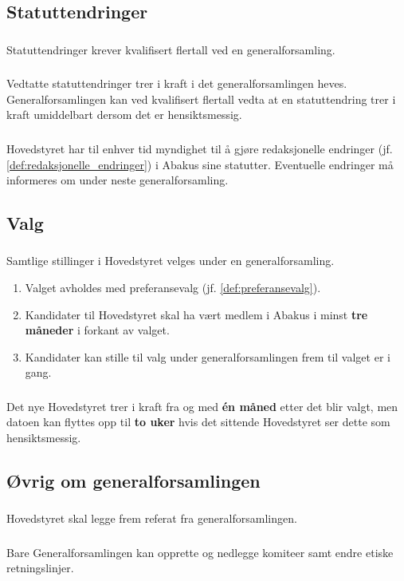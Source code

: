 \subsection{Statuttendringer}
\subsubsection{}
Statuttendringer krever kvalifisert flertall ved en generalforsamling.

\subsubsection{}
Vedtatte statuttendringer trer i kraft i det generalforsamlingen heves. Generalforsamlingen kan ved kvalifisert 
flertall vedta at en statuttendring trer i kraft umiddelbart dersom det er hensiktsmessig.

\subsubsection{}
Hovedstyret har til enhver tid myndighet til å gjøre redaksjonelle endringer (jf. \ref{def:redaksjonelle_endringer}) i
 Abakus sine statutter. Eventuelle endringer må informeres om under neste generalforsamling.

\subsection{Valg}
\subsubsection{}\label{subsec:genfors_valg}
Samtlige stillinger i Hovedstyret velges under en generalforsamling.
\begin{enumerate}[label=\alph*)]
    \item Valget avholdes med preferansevalg (jf. \ref{def:preferansevalg}). 
    \item Kandidater til Hovedstyret skal ha vært medlem i Abakus i minst \textbf{tre måneder} i forkant av valget. 
    \item Kandidater kan stille til valg under generalforsamlingen frem til valget er i gang. 
\end{enumerate}

\subsubsection{}
Det nye Hovedstyret trer i kraft fra og med \textbf{én måned} etter det blir valgt, men datoen kan 
flyttes opp til \textbf{to uker} hvis det sittende Hovedstyret ser dette som hensiktsmessig.

\subsection{Øvrig om generalforsamlingen}
\subsubsection{}
Hovedstyret skal legge frem referat fra generalforsamlingen.

\subsubsection{}
Bare Generalforsamlingen kan opprette og nedlegge komiteer samt endre etiske retningslinjer.
